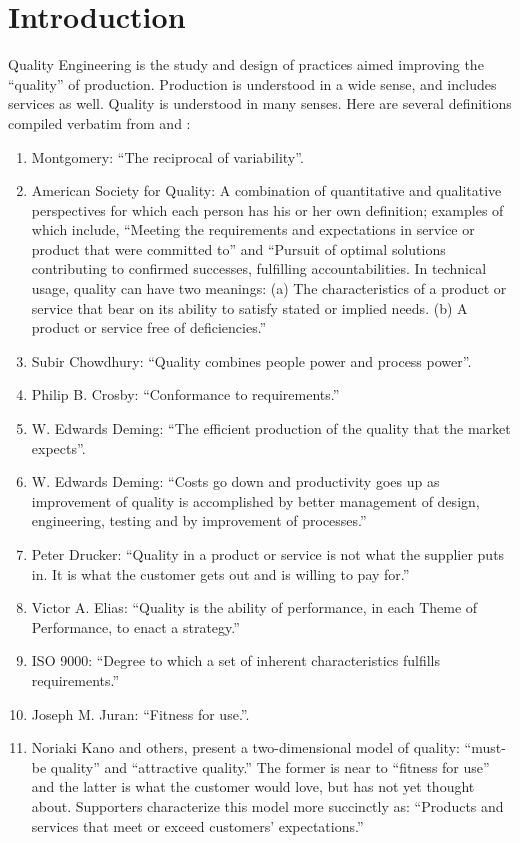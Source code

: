 \chapter{Introduction}
\label{sec:introduction}

Quality Engineering is the study and design of practices aimed improving the ``quality'' of production. 
Production is understood in a wide sense, and includes services as well.
Quality is understood in many senses. Here are several definitions compiled verbatim from \cite{montgomery_introduction_2007}  and \cite{wikipedia_quality_2015}:
\begin{enumerate}
\item Montgomery: ``The reciprocal of variability''.
\item American Society for Quality:
A combination of quantitative and qualitative perspectives for which each person has his or her own definition; examples of which include, ``Meeting the requirements and expectations in service or product that were committed to'' and ``Pursuit of optimal solutions contributing to confirmed successes, fulfilling accountabilities.
 In technical usage, quality can have two meanings: 
 (a) The characteristics of a product or service that bear on its ability to satisfy stated or implied needs. 
 (b) A product or service free of deficiencies.''
\item Subir Chowdhury: 
``Quality combines people power and process power''.
\item Philip B. Crosby: 
``Conformance to requirements.''
\item  W. Edwards Deming:
``The efficient production of the quality that the market expects''.
\item W. Edwards Deming: 
``Costs go down and productivity goes up as improvement of quality is accomplished by better management of design, engineering, testing and by improvement of processes.''
\item Peter Drucker: 
``Quality in a product or service is not what the supplier puts in. It is what the customer gets out and is willing to pay for.''
\item Victor A. Elias: 
``Quality is the ability of performance, in each Theme of Performance, to enact a strategy.''
\item ISO 9000: 
``Degree to which a set of inherent characteristics fulfills requirements.'' 
\item Joseph M. Juran: 
``Fitness for use.''. 
\item Noriaki Kano and others, present a two-dimensional model of quality: ``must-be quality'' and ``attractive quality.'' The former is near to ``fitness for use'' and the latter is what the customer would love, but has not yet thought about. Supporters characterize this model more succinctly as: ``Products and services that meet or exceed customers' expectations.''

\end{enumerate}
